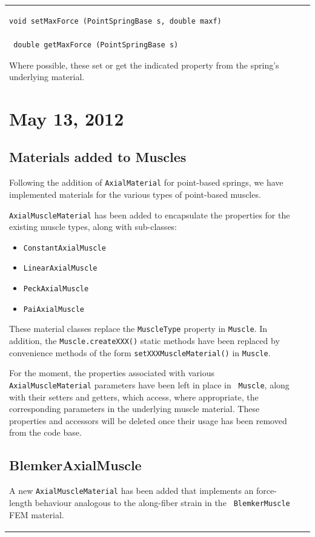 \documentclass{article}
\begin{document}
\begin{tabular}{ll}
\begin{lstlisting}[]
 void setMaxForce (PointSpringBase s, double maxf)

 double getMaxForce (PointSpringBase s)
\end{lstlisting}
Where possible, these set or get the indicated property from
the spring's underlying material.

\section*{May 13, 2012}

\subsection*{Materials added to Muscles}

Following the addition of {\tt AxialMaterial} for point-based springs,
we have implemented materials for the various types of point-based muscles.

{\tt AxialMuscleMaterial} has been added to encapsulate the properties 
for the existing muscle types, along with sub-classes:
\begin{itemize}
\item {\tt ConstantAxialMuscle}
\item {\tt LinearAxialMuscle}
\item {\tt PeckAxialMuscle}
\item {\tt PaiAxialMuscle}
\end{itemize}

These material classes replace the {\tt MuscleType} property in {\tt Muscle}. 
In addition, the {\tt Muscle.createXXX()} static methods have been 
replaced by convenience methods of the form {\tt setXXXMuscleMaterial()} in {\tt Muscle}.

For the moment, the properties associated with various {\tt
AxialMuscleMaterial} parameters have been left in place in {\tt
Muscle}, along with their setters and getters, which access, where
appropriate, the corresponding parameters in the underlying muscle
material. These properties and accessors will be deleted once their
usage has been removed from the code base.

\subsection*{BlemkerAxialMuscle}

A new {\tt AxialMuscleMaterial} has been added that implements an
force-length behaviour analogous to the along-fiber strain in the {\tt
BlemkerMuscle} FEM material.


\end{tabular}
\end{document}
